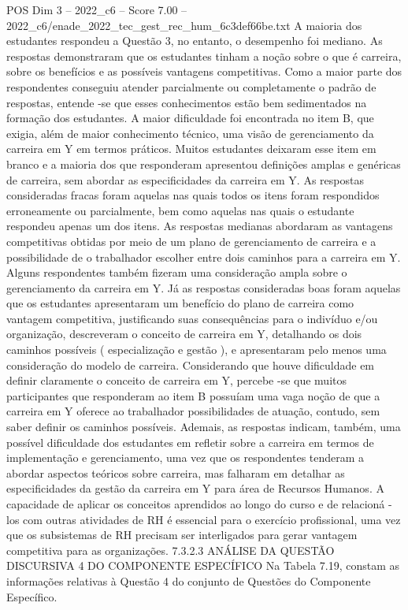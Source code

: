 \begin{textsample}{POS Dim 3 – 2022\_c6 – Score 7.00 – 2022\_c6/enade\_2022\_tec\_gest\_rec\_hum\_6c3def66be.txt}
A maioria dos estudantes respondeu a Questão 3, no entanto, o desempenho foi mediano.
As respostas demonstraram que os estudantes tinham a noção sobre o que é carreira, sobre os benefícios e as possíveis vantagens competitivas.
Como a maior parte dos respondentes conseguiu atender parcialmente ou completamente o padrão de respostas, entende -se que esses conhecimentos estão bem sedimentados na formação dos estudantes.
A maior dificuldade foi encontrada no item B, que exigia, além de maior conhecimento técnico, uma visão de gerenciamento da carreira em Y em termos práticos.
Muitos estudantes deixaram esse item em branco e a maioria dos que responderam apresentou definições amplas e genéricas de carreira, sem abordar as especificidades da carreira em Y.
As respostas consideradas fracas foram aquelas nas quais todos os itens foram respondidos erroneamente ou parcialmente, bem como aquelas nas quais o estudante respondeu apenas um dos itens.
As respostas medianas abordaram as vantagens competitivas obtidas por meio de um plano de gerenciamento de carreira e a possibilidade de o trabalhador escolher entre dois caminhos para a carreira em Y.
Alguns respondentes também fizeram uma consideração ampla sobre o gerenciamento da carreira em Y.
Já as respostas consideradas boas foram aquelas que os estudantes apresentaram um benefício do plano de carreira como vantagem competitiva, justificando suas consequências para o indivíduo e/ou organização, descreveram o conceito de carreira em Y, detalhando os dois caminhos possíveis ( especialização e gestão ), e apresentaram pelo menos uma consideração do modelo de carreira.
Considerando que houve dificuldade em definir claramente o conceito de carreira em Y, percebe -se que muitos participantes que responderam ao item B possuíam uma vaga noção de que a carreira em Y oferece ao trabalhador possibilidades de atuação, contudo, sem saber definir os caminhos possíveis.
Ademais, as respostas indicam, também, uma possível dificuldade dos estudantes em refletir sobre a carreira em termos de implementação e gerenciamento, uma vez que os respondentes tenderam a abordar aspectos teóricos sobre carreira, mas falharam em detalhar as especificidades da gestão da carreira em Y para área de Recursos Humanos.
A capacidade de aplicar os conceitos aprendidos ao longo do curso e de relacioná -los com outras atividades de RH é essencial para o exercício profissional, uma vez que os subsistemas de RH precisam ser interligados para gerar vantagem competitiva para as organizações. 7.3.2.3 ANÁLISE DA QUESTÃO DISCURSIVA 4 DO COMPONENTE ESPECÍFICO Na Tabela 7.19, constam as informações relativas à Questão 4 do conjunto de Questões do Componente Específico.

\end{textsample}

